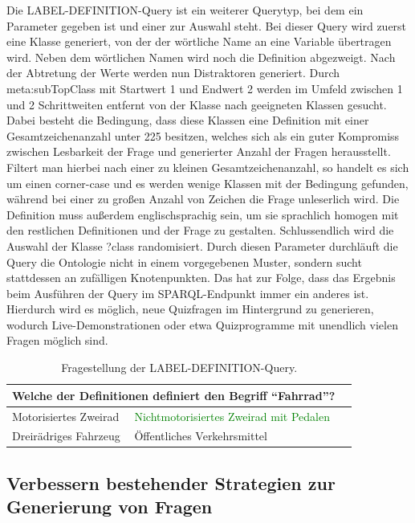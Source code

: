 \documentclass[headsepline,titlepage,ngerman,twoside,12pt]{report}
\begin{document}
Die LABEL-DEFINITION-Query ist ein weiterer Querytyp, bei dem ein Parameter gegeben ist und einer zur Auswahl steht.
Bei dieser Query wird zuerst eine Klasse generiert, von der der wörtliche Name an eine Variable übertragen wird.
Neben dem wörtlichen Namen wird noch die Definition abgezweigt.
Nach der Abtretung der Werte werden nun Distraktoren generiert.
Durch meta:subTopClass mit Startwert 1 und Endwert 2 werden im Umfeld zwischen 1 und 2 Schrittweiten entfernt von der Klasse nach geeigneten Klassen gesucht.
Dabei besteht die Bedingung, dass diese Klassen eine Definition mit einer Gesamtzeichenanzahl unter 225 besitzen, welches sich als ein guter Kompromiss zwischen Lesbarkeit der Frage und generierter Anzahl der Fragen herausstellt.
Filtert man hierbei nach einer zu kleinen Gesamtzeichenanzahl, so handelt es sich um einen corner-case und es werden wenige Klassen mit der Bedingung gefunden, während bei einer zu großen Anzahl von Zeichen die Frage unleserlich wird.
Die Definition muss außerdem englischsprachig sein, um sie sprachlich homogen mit den restlichen Definitionen und der Frage zu gestalten.
Schlussendlich wird die Auswahl der Klasse ?class randomisiert.
Durch diesen Parameter durchläuft die Query die Ontologie nicht in einem vorgegebenen Muster, sondern sucht stattdessen an zufälligen Knotenpunkten.
Das hat zur Folge, dass das Ergebnis beim Ausführen der Query im SPARQL-Endpunkt immer ein anderes ist.
Hierdurch wird es möglich, neue Quizfragen im Hintergrund zu generieren, wodurch Live-Demonstrationen oder etwa Quizprogramme mit unendlich vielen Fragen möglich sind.

\begin{table}
\begin{centering}
\begin{tabularx}{\textwidth}{XXX}
\toprule
\multicolumn{2}{p{0.97\textwidth}}{Welche der Definitionen definiert den Begriff \enquote{Fahrrad}?}\\
\midrule
Motorisiertes Zweirad		&\textcolor{green}{Nichtmotorisiertes Zweirad mit Pedalen}\\
Dreirädriges Fahrzeug		&Öffentliches Verkehrsmittel\\
\bottomrule
\end{tabularx}
\end{centering}
\caption{Fragestellung der LABEL-DEFINITION-Query.}
\label{tab:sparqllabeldefinitionexample}
\end{table}

\subsection{Verbessern bestehender Strategien zur Generierung von Fragen}
\end{document}

